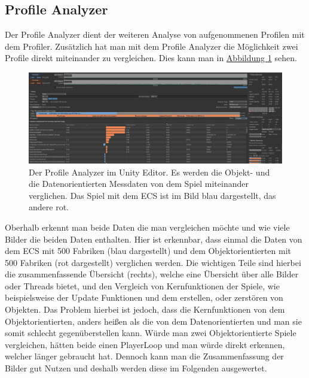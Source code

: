 \subsection{Profile Analyzer}
Der Profile Analyzer dient der weiteren Analyse von aufgenommenen Profilen mit dem Profiler. Zusätzlich hat man mit dem Profile Analyzer die Möglichkeit zwei Profile direkt miteinander zu vergleichen. Dies kann man in \hyperref[fig:profile_analyzer]{Abbildung \ref*{fig:profile_analyzer}} sehen.
\begin{figure}[H]
\centering
\includegraphics[scale=0.31]{Bilder/Profile Analyzer.png}
\caption{Der Profile Analyzer im Unity Editor. Es werden die Objekt- und die Datenorientierten Messdaten von dem Spiel miteinander verglichen. Das Spiel mit dem ECS ist im Bild blau dargestellt, das andere rot.}
\label{fig:profile_analyzer}
\end{figure}
Oberhalb erkennt man beide Daten die man vergleichen möchte und wie viele Bilder die beiden Daten enthalten. Hier ist erkennbar, dass einmal die Daten von dem ECS mit 500 Fabriken (blau dargestellt) und dem Objektorientierten mit 500 Fabriken (rot dargestellt) verglichen werden. Die wichtigen Teile sind hierbei die zusammenfassende Übersicht (rechts), welche eine Übersicht über alle Bilder oder Threads bietet, und den Vergleich von Kernfunktionen der Spiele, wie beispielsweise der Update Funktionen und dem erstellen, oder zerstören von Objekten. Das Problem hierbei ist jedoch, dass die Kernfunktionen von dem Objektorientierten, anders heißen als die von dem Datenorientierten und man sie somit schlecht gegenüberstellen kann. Würde man zwei Objektorientierte Spiele vergleichen, hätten beide einen PlayerLoop und man würde direkt erkennen, welcher länger gebraucht hat. Dennoch kann man die Zusammenfassung der Bilder gut Nutzen und deshalb werden diese im Folgenden ausgewertet.
